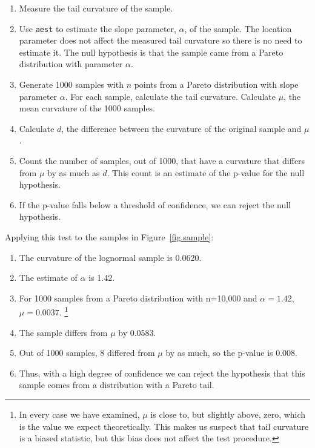 \documentclass[twocolumn,11pt]{infocom}
\begin{document}
\begin{enumerate}

\item Measure the tail curvature of the sample.

\item Use \texttt{aest} to estimate the slope parameter, $\alpha$, of the
sample.  The location parameter does not affect the measured tail
curvature so there is no need to estimate it.  The null hypothesis
is that the sample came from a Pareto distribution with parameter
$\alpha$.

\item Generate 1000 samples with $n$ points from a Pareto distribution
with slope parameter $\alpha$.
For each sample, calculate the tail curvature.
Calculate $\mu$, the mean curvature of the 1000 samples.

\item Calculate $d$, the difference between the curvature of the
original sample and $\mu$.

\item Count the number of samples, out of 1000, that have
a curvature that differs from $\mu$ by as much as $d$.
This count is an estimate of the p-value for the null hypothesis.

\item If the p-value falls below a threshold of confidence, we
can reject the null hypothesis.

\end{enumerate}

Applying this test to the samples in Figure~\ref{fig.sample}:

\begin{enumerate}

\item The curvature of the lognormal sample is 0.0620.

\item The estimate of $\alpha$ is 1.42.

\item For 1000 samples from a Pareto distribution with n=10,000
and $\alpha = 1.42$, $\mu = 0.0037$.  
\footnote{In every case we have examined, $\mu$ is close to,
but slightly above, zero, which is the value we expect theoretically.
This makes us suspect that tail curvature is a biased statistic,
but this bias does not affect the test procedure.}

\item The sample differs from $\mu$ by 0.0583.

\item Out of 1000 samples, 8 differed from $\mu$ by as much,
so the p-value is 0.008.

\item Thus, with a high degree of confidence we can reject the
hypothesis that this sample comes from a distribution with a Pareto tail.

\end{enumerate}
\end{document}
